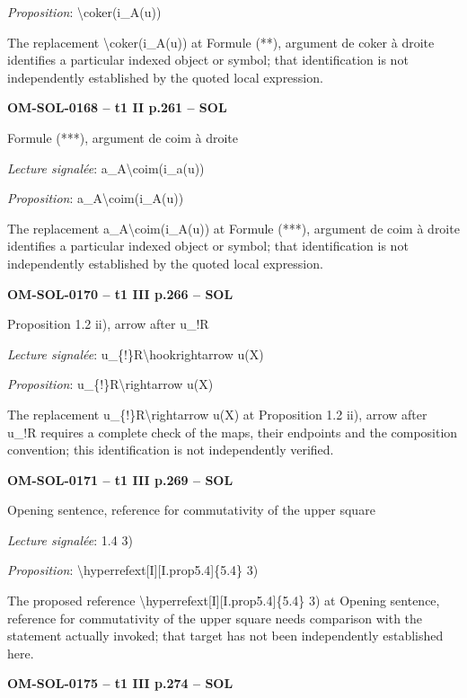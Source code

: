 \emph{Proposition}: \textbackslash{}coker(i\_A(u))\par
The replacement \textbackslash{}coker(i\_A(u)) at Formule (**), argument de coker à droite identifies a particular indexed object or symbol; that identification is not independently established by the quoted local expression.\par
\par\noindent\textbf{OM-SOL-0168 -- t1 II p.261 -- SOL}\par
Formule (***), argument de coim à droite\par
\emph{Lecture signalée}: a\_A\textbackslash{}coim(i\_a(u))\par
\emph{Proposition}: a\_A\textbackslash{}coim(i\_A(u))\par
The replacement a\_A\textbackslash{}coim(i\_A(u)) at Formule (***), argument de coim à droite identifies a particular indexed object or symbol; that identification is not independently established by the quoted local expression.\par
\par\noindent\textbf{OM-SOL-0170 -- t1 III p.266 -- SOL}\par
Proposition 1.2 ii), arrow after u\_!R\par
\emph{Lecture signalée}: u\_\{!\}R\textbackslash{}hookrightarrow u(X)\par
\emph{Proposition}: u\_\{!\}R\textbackslash{}rightarrow u(X)\par
The replacement u\_\{!\}R\textbackslash{}rightarrow u(X) at Proposition 1.2 ii), arrow after u\_!R requires a complete check of the maps, their endpoints and the composition convention; this identification is not independently verified.\par
\par\noindent\textbf{OM-SOL-0171 -- t1 III p.269 -- SOL}\par
Opening sentence, reference for commutativity of the upper square\par
\emph{Lecture signalée}: 1.4 3)\par
\emph{Proposition}: \textbackslash{}hyperrefext[I][I.prop5.4]\{5.4\} 3)\par
The proposed reference \textbackslash{}hyperrefext[I][I.prop5.4]\{5.4\} 3) at Opening sentence, reference for commutativity of the upper square needs comparison with the statement actually invoked; that target has not been independently established here.\par
\par\noindent\textbf{OM-SOL-0175 -- t1 III p.274 -- SOL}\par
